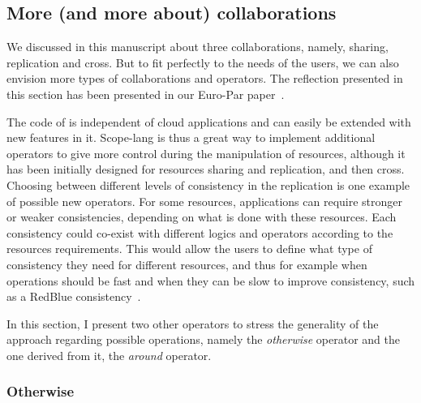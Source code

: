 \subsection{More (and more about) collaborations} %
\label{ssec:more-collabs}

We discussed in this manuscript about three collaborations, namely,
sharing, replication and cross.
%
But to fit perfectly to the needs of the users, we can also envision
more types of collaborations and operators.
%
The reflection presented in this section has been presented in our
Euro-Par paper~\cite{CDL21}.

The code of \scl is independent of cloud applications and can easily
be extended with new features in it.
%
Scope-lang is thus a great way to implement additional operators to
give more control during the manipulation of resources, although it
has been initially designed for resources sharing and replication, and
then cross.
%
Choosing between different levels of consistency in the replication is
one example of possible new operators.
%
For some resources, applications can require stronger or weaker
consistencies, depending on what is done with these resources.
%
Each consistency could co-exist with different logics and operators
according to the resources requirements.
%
This would allow the users to define what type of consistency they
need for different resources, and thus for example when operations
should be fast and when they can be slow to improve consistency, such
as a RedBlue consistency~\cite{LPCG+12}.

%
In this section, I present two other operators to stress the
generality of the approach regarding possible operations, namely the
\emph{otherwise} operator and the one derived from it, the \emph{around} operator.


\subsubsection{Otherwise}

